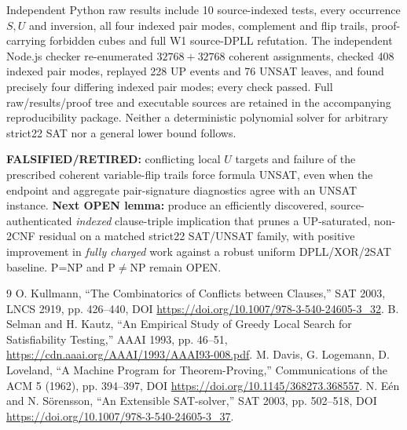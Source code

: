 \documentclass[10pt]{article}
\begin{document}
Independent Python raw results include 10 source-indexed tests, every occurrence $S,U$ and inversion, all four indexed pair modes, complement and flip trails, proof-carrying forbidden cubes and full W1 source-DPLL refutation. The independent Node.js checker re-enumerated $32768+32768$ coherent assignments, checked 408 indexed pair modes, replayed 228 UP events and 76 UNSAT leaves, and found precisely four differing indexed pair modes; every check passed. Full raw/results/proof tree and executable sources are retained in the accompanying reproducibility package. Neither a deterministic polynomial solver for arbitrary strict22 SAT nor a general lower bound follows.

\noindent\textbf{FALSIFIED/RETIRED:} conflicting local $U$ targets and failure of the prescribed coherent variable-flip trails force formula UNSAT, even when the endpoint and aggregate pair-signature diagnostics agree with an UNSAT instance. \textbf{Next OPEN lemma:} produce an efficiently discovered, source-authenticated \emph{indexed} clause-triple implication that prunes a UP-saturated, non-2CNF residual on a matched strict22 SAT/UNSAT family, with positive improvement in \emph{fully charged} work against a robust uniform DPLL/XOR/2SAT baseline. P=NP and P$\ne$NP remain OPEN.
\begin{thebibliography}{9}\small
{} O. Kullmann, ``The Combinatorics of Conflicts between Clauses,'' SAT 2003, LNCS 2919, pp. 426--440, DOI \url{https://doi.org/10.1007/978-3-540-24605-3_32}.
 B. Selman and H. Kautz, ``An Empirical Study of Greedy Local Search for Satisfiability Testing,'' AAAI 1993, pp. 46--51, \url{https://cdn.aaai.org/AAAI/1993/AAAI93-008.pdf}.
 M. Davis, G. Logemann, D. Loveland, ``A Machine Program for Theorem-Proving,'' Communications of the ACM 5 (1962), pp. 394--397, DOI \url{https://doi.org/10.1145/368273.368557}.
 N. E\'en and N. S\"orensson, ``An Extensible SAT-solver,'' SAT 2003, pp. 502--518, DOI \url{https://doi.org/10.1007/978-3-540-24605-3_37}.
\end{thebibliography}
\end{document}
